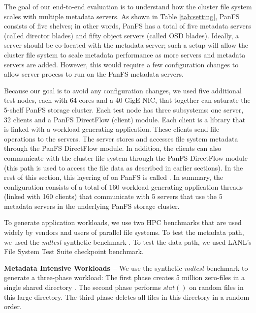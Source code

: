 The goal of our end-to-end evaluation is to understand how the cluster file
system scales with multiple metadata servers.
As shown in Table \ref{tab:setting}, PanFS consists of five shelves; in other
words, PanFS has a total of five metadata servers (called director blades) and
fifty object servers (called OSD blades).
Ideally, a \sys server should be co-located with the metadata server; such a
setup will allow the cluster file system to scale metadata performance as more
\sys servers and metadata servers are added.
However, this would require a few configuration changes to allow \sys server
process to run on the PanFS metadata servers. 

Because our goal is to avoid any configuration changes, we used five additional
test nodes, each with 64 cores and a 40 GigE NIC, that together can saturate 
the 5-shelf PanFS storage cluster.
Each test node has three subsystems: one \sys server, 32 \sys clients and a 
PanFS DirectFlow (client) module.  
Each \sys client is a library that is linked with a workload generating
application. These clients send file operations to the \sys servers. The \sys
server stores and accesses file system metadata through the PanFS DirectFlow
module. In addition, the \sys clients can also communicate with the cluster
file system through the PanFS DirectFlow module (this path is used to access
the file data as described in earlier sections).
In the rest of this section, this layering of \sys on PanFS is called \psys.
In summary, the \psys configuration consists of a total of 160 workload 
generating application threads (linked with 160 \sys clients) that communicate 
with 5 \sys servers that use the 5 metadata servers in the underlying PanFS 
storage cluster. 

To generate application workloads, we use two HPC benchmarks that are used
widely by vendors and users of parallel file systems. 
To test the metadata path, we used the \textit{mdtest} synthetic benchmark 
\cite{mdtest}.
To test the data path, we used LANL's File System Test Suite checkpoint 
benchmark\cite{mpiio}.

\textbf{Metadata Intensive Workloads -- }
We use the synthetic {\it mdtest} benchmark to generate a three-phase workload:
The first phase creates 5 million
zero-files in a single shared directory \cite{ceph:weil06, GIGA11}.
The second phase performs $stat()$ on random files in this large directory.
The third phase deletes all files in this directory in a random order.

